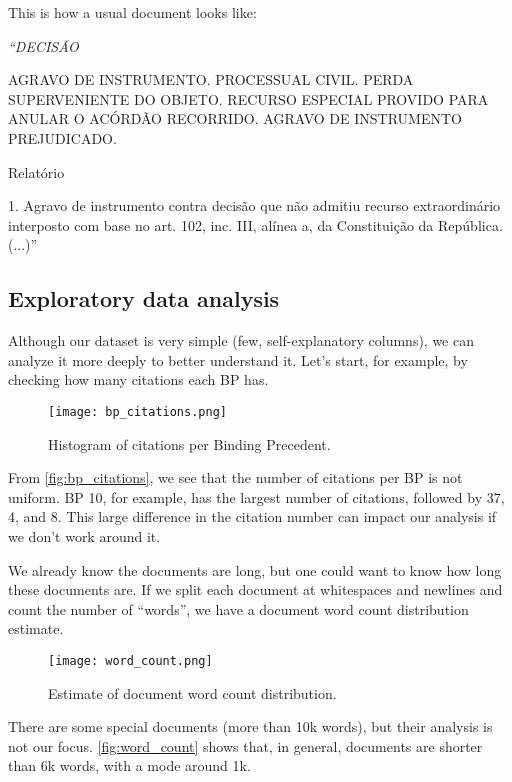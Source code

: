             This is how a usual document looks like:

            \bigskip

            {\itshape``DECISÃO

            AGRAVO DE INSTRUMENTO. PROCESSUAL CIVIL. PERDA SUPERVENIENTE DO OBJETO. RECURSO ESPECIAL PROVIDO PARA ANULAR O ACÓRDÃO RECORRIDO. AGRAVO DE INSTRUMENTO PREJUDICADO.

            Relatório

            1. Agravo de instrumento contra decisão que não admitiu recurso extraordinário interposto com base no art. 102, inc. III, alínea a, da Constituição da República. (...)''}

      \subsection{Exploratory data analysis}

            Although our dataset is very simple (few, self-explanatory columns), we can analyze it more deeply to better understand it. Let's start, for example, by checking how many citations each BP has.

            \begin{figure}[H]
                  \centering
                  \texttt{[image: bp\_citations.png]}
                  \caption{Histogram of citations per Binding Precedent.}
                  \label{fig:bp_citations}
            \end{figure}

            From \autoref{fig:bp_citations}, we see that the number of citations per BP is not uniform. BP 10, for example, has the largest number of citations, followed by 37, 4, and 8. This large difference in the citation number can impact our analysis if we don't work around it.

            We already know the documents are long, but one could want to know how long these documents are. If we split each document at whitespaces and newlines and count the number of ``words'', we have a document word count distribution estimate.

            \begin{figure}[H]
                  \texttt{[image: word\_count.png]}
                  \caption{Estimate of document word count distribution.}
                  \label{fig:word_count}
            \end{figure}

            There are some special documents (more than 10k words), but their analysis is not our focus. \autoref{fig:word_count} shows that, in general, documents are shorter than 6k words, with a mode around 1k.

